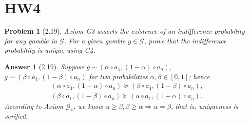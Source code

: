 \documentclass{article}
\newtheorem*{ans}{Answer}
\newtheorem*{prob}{{\bf Problem}}
\newcommand{\1}{{\bf 1}}
\newcommand{\cG}{\mathcal{G}}
\newcommand{\0}{{\mathbf{0}}}
\newcommand{\<}{\langle}
\renewcommand{\>}{\rangle}
\begin{document}
\section{HW4}
\begin{prob}[2.19]
	Axiom G3 asserts the existence of an indifference probability for any gamble in $\cG$. For a given gamble $g \in \cG $, prove that the indifference probability is unique using G4.
\end{prob}
\begin{ans}[2.19]  Suppose $g \sim \left(\alpha \circ a_1 , (1-\alpha)\circ a_n \right)$, $g \sim \left(\beta \circ a_1 , (1-\beta)\circ a_n \right)$ for two probabilities $\alpha ,\beta \in [0,1]$; hence 
\begin{eqnarray*}
\left(\alpha \circ a_1 , (1-\alpha)\circ a_n \right) \succeq  \left(\beta \circ a_1 , (1-\beta)\circ a_n \right), \\
 \left(\beta \circ a_1 , (1-\beta)\circ a_n \right) \succeq  \left(\alpha \circ a_1 , (1-\alpha)\circ a_n \right).
\end{eqnarray*} According to Axiom $\cG_4$, we know $\alpha \ge \beta, \beta \ge \alpha \Rightarrow \alpha = \beta$, that is, uniqueness is verified.
\end{ans}
\end{document}
